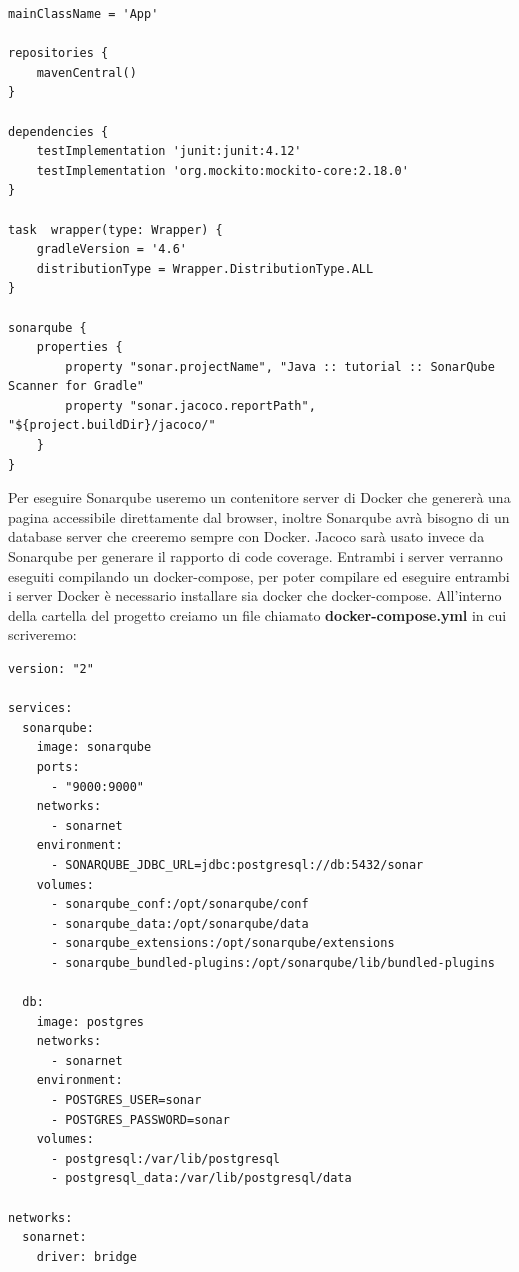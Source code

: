 \begin{enumerate}
\begin{lstlisting}[frame=single]
mainClassName = 'App'

repositories {
    mavenCentral()
}

dependencies {
    testImplementation 'junit:junit:4.12'
    testImplementation 'org.mockito:mockito-core:2.18.0'
}

task  wrapper(type: Wrapper) {
    gradleVersion = '4.6'
    distributionType = Wrapper.DistributionType.ALL
}

sonarqube {
    properties {
        property "sonar.projectName", "Java :: tutorial :: SonarQube Scanner for Gradle"
        property "sonar.jacoco.reportPath", "${project.buildDir}/jacoco/"
    }
}
    \end{lstlisting}
    Per eseguire Sonarqube useremo un contenitore server di Docker che genererà una pagina accessibile direttamente dal browser, inoltre Sonarqube avrà bisogno di un database server che creeremo sempre con Docker. Jacoco sarà usato invece da Sonarqube per generare il rapporto di code coverage. Entrambi i server verranno eseguiti compilando un docker-compose, per poter compilare ed eseguire entrambi i server Docker è necessario installare sia docker che docker-compose. All'interno della cartella del progetto creiamo un file chiamato \textbf{docker-compose.yml} in cui scriveremo:
    \begin{verbatim}
version: "2"

services:
  sonarqube:
    image: sonarqube
    ports:
      - "9000:9000"
    networks:
      - sonarnet
    environment:
      - SONARQUBE_JDBC_URL=jdbc:postgresql://db:5432/sonar
    volumes:
      - sonarqube_conf:/opt/sonarqube/conf
      - sonarqube_data:/opt/sonarqube/data
      - sonarqube_extensions:/opt/sonarqube/extensions
      - sonarqube_bundled-plugins:/opt/sonarqube/lib/bundled-plugins

  db:
    image: postgres
    networks:
      - sonarnet
    environment:
      - POSTGRES_USER=sonar
      - POSTGRES_PASSWORD=sonar
    volumes:
      - postgresql:/var/lib/postgresql
      - postgresql_data:/var/lib/postgresql/data

networks:
  sonarnet:
    driver: bridge


\end{verbatim}
\end{enumerate}
